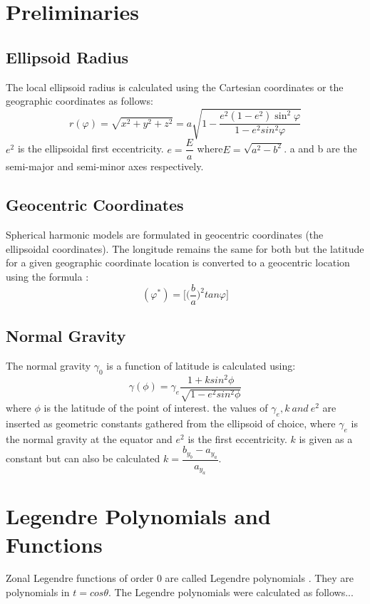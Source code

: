 \section {Preliminaries}
\subsection{Ellipsoid Radius}
The local ellipsoid radius is  calculated using the Cartesian coordinates or the geographic coordinates as follows:
\begin{equation} 
r(\varphi)= \sqrt{x^{2}+y^{2}+z^{2}} = a \sqrt{1-\dfrac{e^{2}(1-e^{2})\sin^{2}\varphi}{1-e^{2}sin^{2}\varphi}}
\end{equation}
$ e^{2} $ is the ellipsoidal first eccentricity. 
$ e=\dfrac{E}{a} $ where$  E=\sqrt{a^{2}-b^{2}} $. a and b are the semi-major and semi-minor axes respectively.
\subsection{Geocentric Coordinates}
Spherical harmonic models are formulated in geocentric  coordinates (the ellipsoidal coordinates). The longitude remains the same for both but the latitude for a given geographic coordinate location is converted to a geocentric location using the formula :
\begin{equation} 
(\varphi^{*})= 
\Big[  \big(  \dfrac{b}{a}  \big)^{2} tan \varphi \Big]
\end{equation}
\subsection{ Normal Gravity}
The normal gravity $ \gamma_{0}$ is a function of latitude is  calculated using:
\begin{equation} 
\gamma(\phi)= \gamma_{e}\dfrac{1+ksin^{2}\phi}{\sqrt{1-e^{2}sin^{2}\phi}}
\end{equation}
where $\phi  $ is the latitude of the point of interest.
the values of $ \gamma_{e},k \ and \ e^{2} $ are inserted as geometric constants gathered from the ellipsoid of choice, where $ \gamma_{e} $ is the normal gravity at the equator and $ e^{2} $ is the first eccentricity. $ k $ is given as a constant but can also be calculated $ k=\dfrac{b_{y_{b}}-a_{y_{a}}}{a_{y_{a}}} $.


\section{Legendre Polynomials and Functions}
Zonal Legendre functions of order 0 are called Legendre polynomials \cite{nicoPhysicalgeodesy}. They are polynomials in $ t =cos \theta $. 
The Legendre polynomials were calculated as follows...

